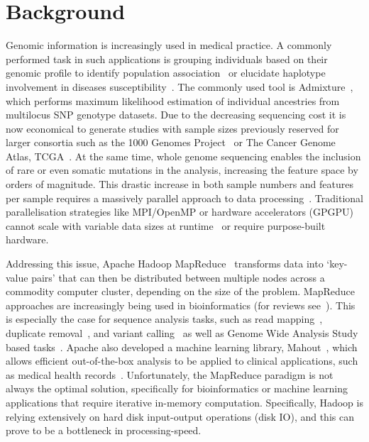 \documentclass{bmcart}
\begin{document}

\section*{Background}

Genomic information is increasingly used in medical practice.
A commonly performed task in such applications is grouping individuals based on their genomic profile to identify population association~\cite{Gao2007} or elucidate haplotype involvement in diseases susceptibility~\cite{Laitman2013}.
The commonly used tool is {\sc Admixture}~\cite{Alexander2009}, which performs maximum likelihood estimation of individual ancestries from multilocus SNP genotype datasets.
Due to the decreasing sequencing cost it is now economical to generate studies with sample sizes previously reserved for larger consortia such as the 1000 Genomes Project~\cite{1KG2012} or The Cancer Genome Atlas, TCGA~\cite{TCGA2013}. 
At the same time, whole genome sequencing enables the inclusion of rare or even somatic mutations in the analysis, increasing the feature space by orders of magnitude. This drastic increase in both sample numbers and features per sample requires a massively parallel approach to data processing~\cite{Stein2010}. Traditional parallelisation strategies like MPI/OpenMP or hardware accelerators (GPGPU) cannot scale with variable data sizes at runtime~\cite{ReyesOrtiz2015121} or require purpose-built hardware.
 
Addressing this issue, {\sc Apache Hadoop MapReduce}~\cite{Borthakur2007} transforms data into `key-value pairs' that can then be distributed between multiple nodes across a commodity computer cluster, depending on the size of the problem. 
MapReduce approaches are increasingly being used in bioinformatics (for reviews see~\cite{Zou2013, Qiu2010,Taylor2010}). 
This is especially the case for sequence analysis tasks, such as read mapping~\cite{Schatz2009}, duplicate removal~\cite{Jourdren2012}, and variant calling~\cite{Langmead2009, McKenna2010} as well as Genome Wide Analysis Study based tasks~\cite{Huang2013, Guo2014}. 
Apache also developed a machine learning library, Mahout~\cite{Owen2011}, which allows efficient out-of-the-box analysis to be applied to clinical applications, such as medical health records~\cite{Ko2014}.
Unfortunately, the MapReduce paradigm is not always the optimal solution, specifically for bioinformatics or machine learning applications that require iterative in-memory computation. Specifically, Hadoop is relying extensively on hard disk input-output operations (disk IO), and this can prove to be a bottleneck in processing-speed.
\end{document}
